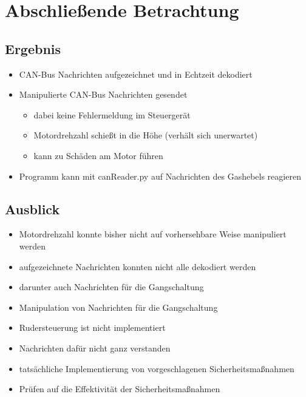 \chapter{Abschließende Betrachtung}

\section{Ergebnis}
\begin{itemize}
    \item CAN-Bus Nachrichten aufgezeichnet und in Echtzeit dekodiert
    \item Manipulierte CAN-Bus Nachrichten gesendet \begin{itemize}
        \item dabei keine Fehlermeldung im Steuergerät
        \item Motordrehzahl schießt in die Höhe (verhält sich unerwartet)
        \item kann zu Schäden am Motor führen
    \end{itemize}
    \item Programm kann mit canReader.py auf Nachrichten des Gashebels reagieren
\end{itemize}

\section{Ausblick}
\begin{itemize}
    \item Motordrehzahl konnte bisher nicht auf vorhersehbare Weise manipuliert werden
    \item aufgezeichnete Nachrichten konnten nicht alle dekodiert werden
    \item darunter auch Nachrichten für die Gangschaltung
    \item Manipulation von Nachrichten für die Gangschaltung
    \item Rudersteuerung ist nicht implementiert
    \item Nachrichten dafür nicht ganz verstanden
    \item tatsächliche Implementierung von vorgeschlagenen Sicherheitsmaßnahmen
    \item Prüfen auf die Effektivität der Sicherheitsmaßnahmen
\end{itemize}